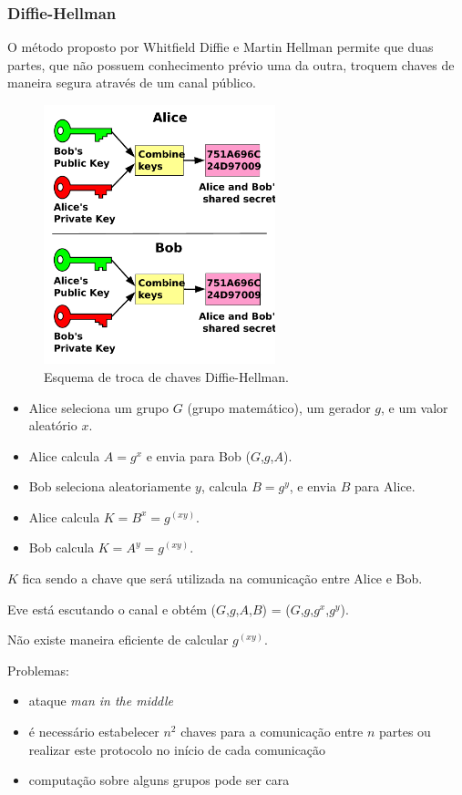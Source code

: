 \begin{frame}[allowframebreaks]
\frametitle{Diffie-Hellman}
O método proposto por Whitfield Diffie e Martin Hellman permite que duas partes,
que não possuem conhecimento prévio uma da outra, troquem chaves de maneira segura através de um canal público.

\begin{figure}[h]
\centering
\includegraphics[width=0.6\textwidth,height=0.6\textheight,keepaspectratio]{figures/public_key_shared_secret.pdf}
\caption{Esquema de troca de chaves Diffie-Hellman.}
\label{fig-delffiehellman}
\end{figure}

\framebreak
\begin{itemize}
\item Alice seleciona um grupo $G$ (grupo matemático), um gerador $g$, e um valor aleatório $x$.
\item Alice calcula $A = g^x$ e envia para Bob ($G$,$g$,$A$).
\item Bob seleciona aleatoriamente $y$, calcula $B = g^y$, e envia $B$ para Alice.
\item Alice calcula $K = B^x= g^{(xy)}$.
\item Bob calcula $K = A^y= g^{(xy)}$.
\end{itemize}

$K$ fica sendo a chave que será utilizada na comunicação entre Alice e Bob.

Eve está escutando o canal e obtém ($G$,$g$,$A$,$B$) = ($G$,$g$,$g^x$,$g^y$).

Não existe maneira eficiente de calcular $g^{(xy)}$.

\framebreak
Problemas:
\begin{itemize}
\item ataque \emph{man in the middle}
\item é necessário estabelecer $n^2$ chaves para a comunicação entre $n$ partes ou realizar este protocolo no início de cada comunicação
\item computação sobre alguns grupos pode ser cara
\end{itemize}

\end{frame}


